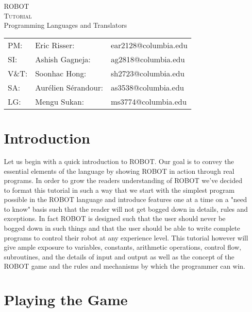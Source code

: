 \documentclass[a4paper]{article}
\begin{document}
\thispagestyle{empty}
\vspace*{9cm}
\begin{center}
	\Huge ROBOT\\
	\textsc{Tutorial}\\
	\normalsize Programming Languages and Translators
\end{center}

\vspace*{9cm}
\begin{tabular}{lll}
PM: & Eric Risser: & ear2128@columbia.edu\\
SI: & Ashish Gagneja: & ag2818@columbia.edu\\
V\&T: & Soonhac Hong: & sh2723@columbia.edu\\
SA: & Aur\'elien S\'erandour: & as3538@columbia.edu\\
LG: & Mengu Sukan: & ms3774@columbia.edu\\
\end{tabular}

\newpage

\vspace*{\fill}
\tableofcontents
\vspace*{\fill}

\newpage

\section*{Introduction}

Let us begin with a quick introduction to ROBOT. Our goal is to convey the essential elements of the language by showing ROBOT in action through real programs. In order to grow the readers understanding of ROBOT we've decided to format this tutorial in such a way that we start with the simplest program possible in the ROBOT language and introduce features one at a time on a "need to know" basis such that the reader will not get bogged down in details, rules and exceptions. In fact ROBOT is designed such that the user should never be bogged down in such things and that the user should be able to write complete programs to control their robot at any experience level. This tutorial however will give ample exposure to variables, constants, arithmetic operations, control flow, subroutines, and the details of input and output as well as the concept of the ROBOT game and the rules and mechanisms by which the programmer can win.\\

\section{Playing the Game}
\end{document}
